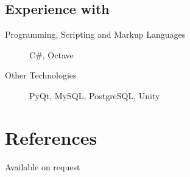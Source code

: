 \documentclass[margin,line,a4paper]{resume}
\begin{document}
\begin{resume}
        \subsection{\mysidestyle Experience with}
            \begin{description}
                \item [Programming, Scripting and Markup Languages] C\#, Octave
                \item [Other Technologies] PyQt, MySQL, PostgreSQL, Unity
            \end{description}

        \section{\mysidestyle References}
            Available on request
    \end{resume}
\end{document}
